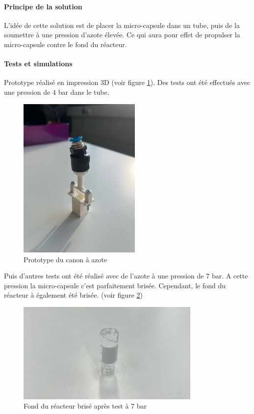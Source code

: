 \paragraph{Principe de la solution}
L'idée de cette solution est de placer la micro-capsule dans un tube, puis de la soumettre à une pression d'azote élevée.
Ce qui aura pour effet de propulser la micro-capsule contre le fond du réacteur.

\paragraph{Tests et simulations}
Prototype réalisé en impression 3D (voir figure \ref{fig:proto_canon}).
Des tests ont été effectués avec une pression de 4 bar dans le tube.

\begin{figure}[H]
    \centering
    \includegraphics[width=6cm]{Images/Illustrations/Solutions/Proto_canon.jpg}
    \caption{Prototype du canon à azote}
    \label{fig:proto_canon}
\end{figure}

Puis d'autres tests ont été réalisé avec de l'azote à une pression de 7 bar.
A cette pression la micro-capsule c'est parfaitement brisée. Cependant, le fond du réacteur à également été brisée. 
(voir figure \ref{fig:fond_reacteur})

\begin{figure}[H]
    \centering
    \includegraphics[width=9cm]{Images/Illustrations/Solutions/Reacteur_casse.jpg}
    \caption{Fond du réacteur brisé après test à 7 bar}
    \label{fig:fond_reacteur}
\end{figure}


